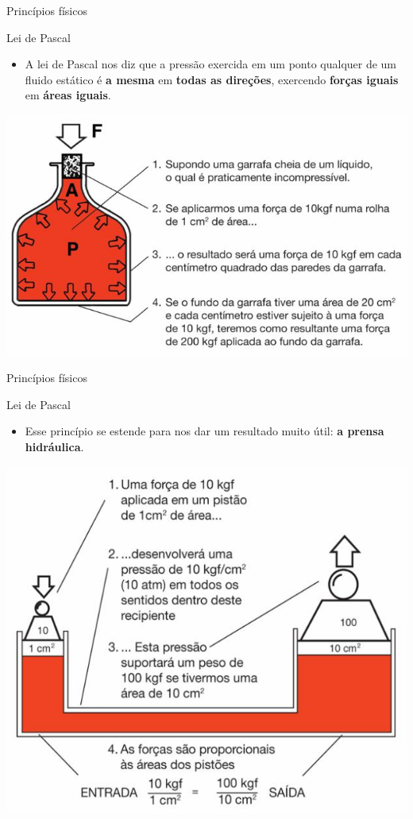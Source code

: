 \begin{frame}{Princípios físicos}
	\begin{block}{Lei de Pascal}
		\begin{itemize}
			\item A lei de Pascal nos diz que a pressão exercida em um ponto qualquer de um fluido estático é \textbf{a mesma} em \textbf{todas as direções}, exercendo \textbf{forças iguais} em \textbf{áreas iguais}.
		\end{itemize}
	\end{block}
	
	\centering
	\includegraphics[width=0.7\linewidth]{Figuras/Ch15/fig2}
	
\end{frame}


\begin{frame}{Princípios físicos}
	\begin{block}{Lei de Pascal}
		\begin{itemize}
			\item Esse princípio se estende para nos dar um resultado muito útil: \textbf{a prensa hidráulica}.
		\end{itemize}
	\end{block}
	
	\centering
	\includegraphics[width=0.55\linewidth]{Figuras/Ch15/fig3}
	
\end{frame}


